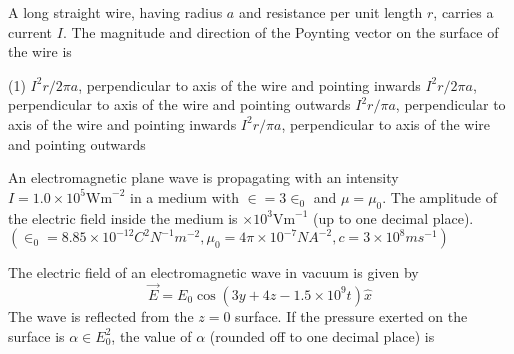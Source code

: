 \begin{enumerate}
\begin{tasks}
\end{tasks}
\begin{minipage}{\textwidth}
	\item A long straight wire, having radius $a$ and resistance per unit length $r$, carries a current $I$. The magnitude and direction of the Poynting vector on the surface of the wire is
\end{minipage}
\begin{tasks}(1)
	\task[\textbf{A.}] $I^{2} r / 2 \pi a$, perpendicular to axis of the wire and pointing inwards
	\task[\textbf{B.}]$I^{2} r / 2 \pi a$, perpendicular to axis of the wire and pointing outwards
	\task[\textbf{C.}]$I^{2} r / \pi a$, perpendicular to axis of the wire and pointing inwards
	\task[\textbf{D.}]$I^{2} r / \pi a$, perpendicular to axis of the wire and pointing outwards
\end{tasks}
\begin{minipage}{\textwidth}
	\item An electromagnetic plane wave is propagating with an intensity $I=1.0 \times 10^{5} \mathrm{Wm}^{-2}$ in a medium with $\in=3 \in_{0}$ and $\mu=\mu_{0}$. The amplitude of the electric field inside the medium is $\times 10^{3} \mathrm{Vm}^{-1}$ (up to one decimal place). $\left(\in_{0}=8.85 \times 10^{-12} C^{2} N^{-1} m^{-2}, \mu_{0}=4 \pi \times 10^{-7} N A^{-2}, c=3 \times 10^{8} m s^{-1}\right)$
\end{minipage}
\begin{minipage}{\textwidth}
	\item The electric field of an electromagnetic wave in vacuum is given by
	$$
	\vec{E}=E_{0} \cos \left(3 y+4 z-1.5 \times 10^{9} t\right) \hat{x}
	$$
	The wave is reflected from the $z=0$ surface. If the pressure exerted on the surface is $\alpha \in E_{0}^{2}$, the value of $\alpha$ (rounded off to one decimal place) is
\end{minipage}
 \end{enumerate}

